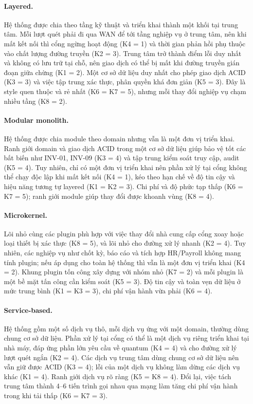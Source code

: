 \paragraph{Layered.} Hệ thống được chia theo tầng kỹ thuật và triển khai thành một khối tại trung tâm. Mỗi lượt quét phải đi qua WAN để tới tầng nghiệp vụ ở trung tâm, nên khi mất kết nối thì cổng ngừng hoạt động (K4 = 1) và thời gian phản hồi phụ thuộc vào chất lượng đường truyền (K2 = 3). Trung tâm trở thành điểm lỗi duy nhất và không có lưu trữ tại chỗ, nên giao dịch có thể bị mất khi đường truyền gián đoạn giữa chừng (K1 = 2). Một cơ sở dữ liệu duy nhất cho phép giao dịch ACID (K3 = 3) và việc tập trung xác thực, phân quyền khá đơn giản (K5 = 3). Đây là style quen thuộc và rẻ nhất (K6 = K7 = 5), nhưng mỗi thay đổi nghiệp vụ chạm nhiều tầng (K8 = 2).

\paragraph{Modular monolith.} Hệ thống được chia module theo domain nhưng vẫn là một đơn vị triển khai. Ranh giới domain và giao dịch ACID trong một cơ sở dữ liệu giúp bảo vệ tốt các bất biến như INV-01, INV-09 (K3 = 4) và tập trung kiểm soát truy cập, audit (K5 = 4). Tuy nhiên, chỉ có một đơn vị triển khai nên phần xử lý tại cổng không thể chạy độc lập khi mất kết nối (K4 = 1), kéo theo hạn chế về độ tin cậy và hiệu năng tương tự layered (K1 = K2 = 3). Chi phí và độ phức tạp thấp (K6 = K7 = 5); ranh giới module giúp thay đổi được khoanh vùng (K8 = 4).

\paragraph{Microkernel.} Lõi nhỏ cùng các plugin phù hợp với việc thay đổi nhà cung cấp cổng xoay hoặc loại thiết bị xác thực (K8 = 5), và lõi nhỏ cho đường xử lý nhanh (K2 = 4). Tuy nhiên, các nghiệp vụ như chốt kỳ, báo cáo và tích hợp HR/Payroll không mang tính plugin; nếu áp dụng cho toàn hệ thống thì vẫn là một đơn vị triển khai (K4 = 2). Khung plugin tốn công xây dựng với nhóm nhỏ (K7 = 2) và mỗi plugin là một bề mặt tấn công cần kiểm soát (K5 = 3). Độ tin cậy và toàn vẹn dữ liệu ở mức trung bình (K1 = K3 = 3), chi phí vận hành vừa phải (K6 = 4).

\paragraph{Service-based.} Hệ thống gồm một số dịch vụ thô, mỗi dịch vụ ứng với một domain, thường dùng chung cơ sở dữ liệu. Phần xử lý tại cổng có thể là một dịch vụ riêng triển khai tại nhà máy, đáp ứng phần lớn yêu cầu về quantum (K4 = 4) và cho đường xử lý lượt quét ngắn (K2 = 4). Các dịch vụ trung tâm dùng chung cơ sở dữ liệu nên vẫn giữ được ACID (K3 = 4); lỗi của một dịch vụ không làm dừng các dịch vụ khác (K1 = 4). Ranh giới dịch vụ rõ ràng (K5 = K8 = 4). Đổi lại, việc tách trung tâm thành 4--6 tiến trình gọi nhau qua mạng làm tăng chi phí vận hành trong khi tải thấp (K6 = K7 = 3).

